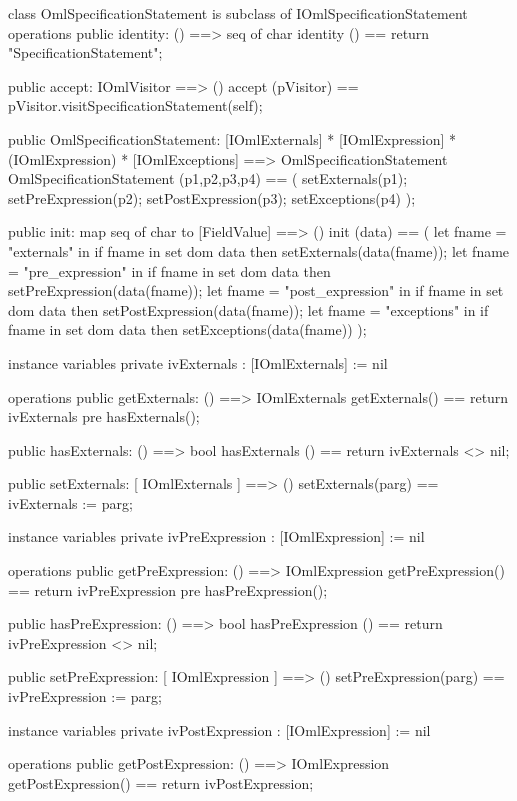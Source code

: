 \begin{vdm_al}
class OmlSpecificationStatement is subclass of IOmlSpecificationStatement
operations
  public identity: () ==> seq of char
  identity () == return "SpecificationStatement";

  public accept: IOmlVisitor ==> ()
  accept (pVisitor) == pVisitor.visitSpecificationStatement(self);

  public OmlSpecificationStatement:
      [IOmlExternals] *
      [IOmlExpression] *
      (IOmlExpression) *
      [IOmlExceptions] ==> OmlSpecificationStatement
  OmlSpecificationStatement (p1,p2,p3,p4) == 
   ( setExternals(p1);
     setPreExpression(p2);
     setPostExpression(p3);
     setExceptions(p4) );

  public init: map seq of char to [FieldValue] ==> ()
  init (data) ==
    ( let fname = "externals" in
        if fname in set dom data
        then setExternals(data(fname));
      let fname = "pre_expression" in
        if fname in set dom data
        then setPreExpression(data(fname));
      let fname = "post_expression" in
        if fname in set dom data
        then setPostExpression(data(fname));
      let fname = "exceptions" in
        if fname in set dom data
        then setExceptions(data(fname)) );

instance variables
  private ivExternals : [IOmlExternals] := nil

operations
  public getExternals: () ==> IOmlExternals
  getExternals() == return ivExternals
    pre hasExternals();

  public hasExternals: () ==> bool
  hasExternals () == return ivExternals <> nil;

  public setExternals: [ IOmlExternals ] ==> ()
  setExternals(parg) == ivExternals := parg;

instance variables
  private ivPreExpression : [IOmlExpression] := nil

operations
  public getPreExpression: () ==> IOmlExpression
  getPreExpression() == return ivPreExpression
    pre hasPreExpression();

  public hasPreExpression: () ==> bool
  hasPreExpression () == return ivPreExpression <> nil;

  public setPreExpression: [ IOmlExpression ] ==> ()
  setPreExpression(parg) == ivPreExpression := parg;

instance variables
  private ivPostExpression : [IOmlExpression] := nil

operations
  public getPostExpression: () ==> IOmlExpression
  getPostExpression() == return ivPostExpression;


\end{vdm_al}
